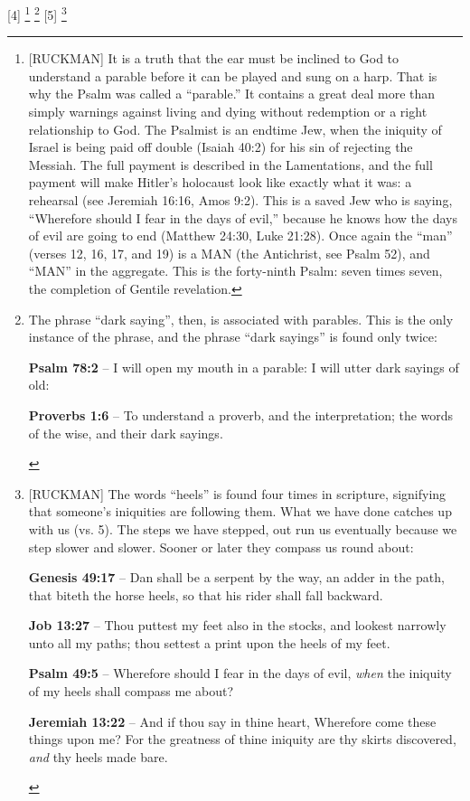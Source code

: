 [4] \footnote{[RUCKMAN] It is a truth that the ear must be inclined to God to understand a parable before it can be played and sung on a harp. That is why the Psalm was called a ``parable.'' It contains a great deal more than simply warnings against living and dying without redemption or a right relationship to God. The Psalmist is an endtime Jew, when the iniquity of Israel is being paid off double (Isaiah 40:2) for his sin of rejecting the Messiah. The full payment is described in the Lamentations, and the full payment will make Hitler’s holocaust look like exactly what it was: a rehearsal (see Jeremiah 16:16, Amos 9:2). This is a saved Jew who is saying, “Wherefore should I fear in the days of evil,” because he knows how the days of evil are going to end (Matthew 24:30, Luke 21:28). Once again the “man” (verses 12, 16, 17, and 19) is a MAN (the Antichrist, see Psalm 52), and “MAN” in the aggregate. This is the forty-ninth Psalm: seven times seven, the completion of Gentile revelation.\cite{Ruckman1992Psalms}} \footnote{The phrase ``dark saying'', then, is associated with parables. This is the only instance of the phrase, and the phrase ``dark sayings'' is found only twice: \begin{compactenum}
\item \textbf{Psalm 78:2} -- I will open my mouth in a parable: I will utter dark sayings of old: 
\item \textbf{Proverbs 1:6} -- To understand a proverb, and the interpretation; the words of the wise, and their dark sayings.
\end{compactenum} }
[5] \footnote{[RUCKMAN] The words ``heels'' is found four times in scripture, signifying that someone’s iniquities are following them. What we have done catches up with us (vs. 5). The steps we have stepped, out run us eventually because we step slower and slower. Sooner or later they compass us round about: \cite{Ruckman1992Psalms}
\begin{compactenum}
\item \textbf{Genesis 49:17} -- Dan shall be a serpent by the way, an adder in the path, that biteth the horse heels, so that his rider shall fall backward.
\item \textbf{Job 13:27} -- Thou puttest my feet also in the stocks, and lookest narrowly unto all my paths; thou settest a print upon the heels of my feet.
\item \textbf{Psalm 49:5} -- Wherefore should I fear in the days of evil, \emph{when} the iniquity of my heels shall compass me about?
\item \textbf{Jeremiah 13:22} -- And if thou say in thine heart, Wherefore come these things upon me? For the greatness of thine iniquity are thy skirts discovered, \emph{and} thy heels made bare.
\end{compactenum} 
}
